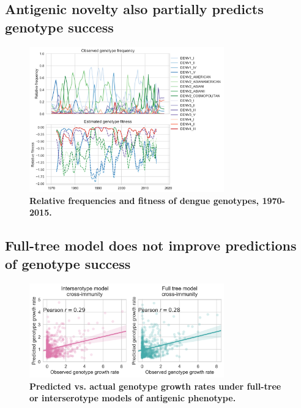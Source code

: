 \documentclass[11pt,oneside,letterpaper]{article}
\begin{document}
\subsection{Antigenic novelty also partially predicts genotype success}
\begin{figure}[h]
\centering
\includegraphics[width=0.75\textwidth]{../figures/png/genotype-fitness.png}
    \caption{\textbf{Relative frequencies and fitness of dengue genotypes, 1970-2015.}}
     \label{genotype_fitness}
\end{figure}


\subsection{Full-tree model does not improve predictions of genotype success}
\begin{figure}[h]
\centering
\includegraphics[width=0.75\textwidth]{../figures/png/genotype_growth_rates.png}
    \caption{\textbf{Predicted vs. actual genotype growth rates under full-tree or interserotype models of antigenic phenotype.}}
     \label{genotype_growth_rates}
\end{figure}
\end{document}
